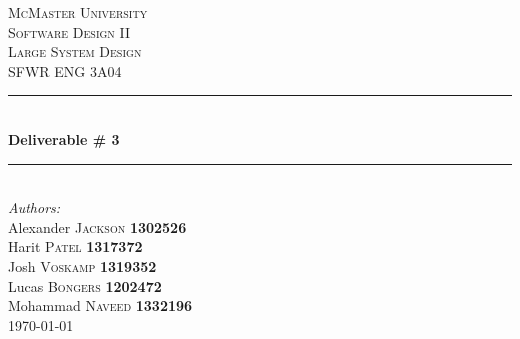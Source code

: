 \documentclass[]{article}
\begin{document}
\cleardoublepage
{}
\begin{titlepage}
	\newcommand{\HRule}{\rule{\linewidth}{0.5mm}} %
	\center %


	\textsc{\LARGE McMaster University}\\[1.5cm] %
	\textsc{\Large Software Design II \\  \Large Large System Design}\\[0.5cm] %
	\textsc{\large SFWR ENG 3A04}\\[0.5cm] %


	\HRule \\[0.4cm]
	{ \huge \bfseries Deliverable \# 3}\\[0.4cm] %
	\HRule \\[1.5cm]


	\Large \emph{Authors:}\\
	Alexander \textsc{Jackson} \textbf{1302526} \\
	Harit \textsc{Patel} \textbf{1317372} \\ %
	Josh \textsc{Voskamp} \textbf{1319352} \\
	Lucas \textsc{Bongers} \textbf{1202472} \\
	Mohammad \textsc{Naveed} \textbf{1332196} \\[3cm]

	{\large \today}\\[3cm] %

	\vfill %

\end{titlepage}
\end{document}
